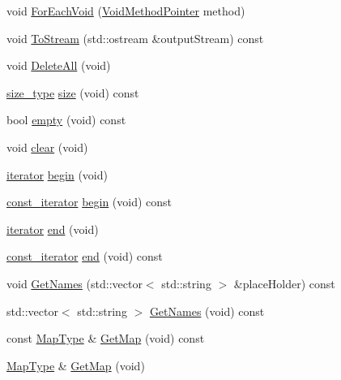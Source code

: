 \begin{DoxyCompactItemize}
\item 
void \hyperlink{classcmn_named_map_ae0a0c6bec0c43bd152aa29b396a7dccb}{For\+Each\+Void} (\hyperlink{classcmn_named_map_a78add53bc0e9b925dc3c5ec981994d2b}{Void\+Method\+Pointer} method)
\item 
void \hyperlink{classcmn_named_map_a1082cdd551da4064ac01d1687bf91bf2}{To\+Stream} (std\+::ostream \&output\+Stream) const 
\item 
void \hyperlink{classcmn_named_map_a7b4699c7d3e7bcda36f0d5f3615a9594}{Delete\+All} (void)
\item 
\hyperlink{classcmn_named_map_aaaf5963f1e9b26efb08e7f0cd7199335}{size\+\_\+type} \hyperlink{classcmn_named_map_a5c545600ff58364bef71df804078378f}{size} (void) const 
\item 
bool \hyperlink{classcmn_named_map_a6f8ee322e0cef9aa6841dfe4e9b51b0b}{empty} (void) const 
\item 
void \hyperlink{classcmn_named_map_ab1bb56227b49802271d395b99af72bcb}{clear} (void)
\item 
\hyperlink{classcmn_named_map_a0ad463b349c3c95e8f639e12f492765e}{iterator} \hyperlink{classcmn_named_map_a1161a0e7eaaf2b34cd6747f29e9f52d7}{begin} (void)
\item 
\hyperlink{classcmn_named_map_a94a2be09d6678944e3a330c641d69d41}{const\+\_\+iterator} \hyperlink{classcmn_named_map_aefff0d0c751cf9fee634b95bd796abcd}{begin} (void) const 
\item 
\hyperlink{classcmn_named_map_a0ad463b349c3c95e8f639e12f492765e}{iterator} \hyperlink{classcmn_named_map_a593995b97e2051fb19a53ba3d27fd207}{end} (void)
\item 
\hyperlink{classcmn_named_map_a94a2be09d6678944e3a330c641d69d41}{const\+\_\+iterator} \hyperlink{classcmn_named_map_a5c0a21bb49e60dfd6c585ce3c3406bf4}{end} (void) const 
\end{DoxyCompactItemize}
{\bf }\par
\begin{DoxyCompactItemize}
\item 
void \hyperlink{classcmn_named_map_aa606927a1fb85df463d2148200923f40}{Get\+Names} (std\+::vector$<$ std\+::string $>$ \&place\+Holder) const 
\item 
std\+::vector$<$ std\+::string $>$ \hyperlink{classcmn_named_map_a4748c784451cca8eda41a7959b71f434}{Get\+Names} (void) const 
\end{DoxyCompactItemize}

{\bf }\par
\begin{DoxyCompactItemize}
\item 
const \hyperlink{classcmn_named_map_a35919ad9cccf3e060063b489db663425}{Map\+Type} \& \hyperlink{classcmn_named_map_a10b7d4cf884a7b5cb44aeb7133452049}{Get\+Map} (void) const 
\item 
\hyperlink{classcmn_named_map_a35919ad9cccf3e060063b489db663425}{Map\+Type} \& \hyperlink{classcmn_named_map_a2e819ccf5448f3b47f50246e61f5b453}{Get\+Map} (void)
\end{DoxyCompactItemize}

